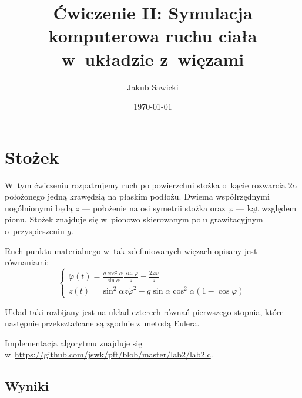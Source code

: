 \documentclass[a4paper; 12pt]{article}
\title{Ćwiczenie II: Symulacja komputerowa ruchu ciała w~układzie z~więzami}
\author{Jakub Sawicki}
\date{\today}
\begin{document}
\renewcommand{\figurename}{Rys.}
\renewcommand{\tablename}{Tab.}
\renewcommand{\abstractname}{Abstrakt}

\maketitle

\section{Stożek}

W~tym ćwiczeniu rozpatrujemy ruch po powierzchni stożka o~kącie rozwarcia
$2\alpha$ położonego jedną krawędzią na płaskim podłożu.
Dwiema współrzędnymi uogólnionymi będą $z$ --- położenie na osi symetrii stożka
oraz $\varphi$ --- kąt względem pionu.
Stożek znajduje się w~pionowo skierowanym polu grawitacyjnym o~przyspieszeniu $g$.

Ruch punktu materialnego w~tak zdefiniowanych więzach opisany jest równaniami:
\begin{equation}
    \begin{cases}
        \ddot{\varphi}(t) = \frac{g\cos^2{\alpha}}{\sin{\alpha}}\frac{\sin{\varphi}}{z}
            - \frac{2\dot{z}\dot{\varphi}}{z} \\
        \ddot{z}(t) = \sin^2{\alpha}z\dot{\varphi}^2 
            - g\sin{\alpha}\cos^2{\alpha}(1-\cos{\varphi})
    \end{cases}
    \label{eq:ODE}
\end{equation}

Układ taki rozbijany jest na układ czterech równań pierwszego stopnia, które
następnie przekształcane są zgodnie z~metodą Eulera.

Implementacja algorytmu znajduje się
w~\url{https://github.com/jswk/pft/blob/master/lab2/lab2.c}.

\subsection{Wyniki}
\end{document}
